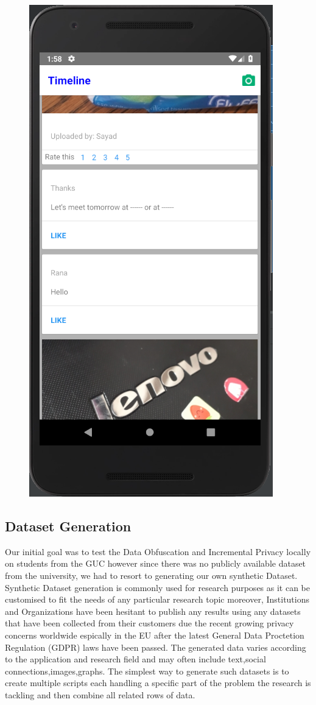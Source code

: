 \begin{figure}[!ht]
\begin{minipage}{.5\textwidth}
      \includegraphics[width=.6\linewidth]{Censor}
      \label{fig:censor}
    \end{minipage}
\end{figure}
\subsection{Dataset Generation}
Our initial goal was to test the Data Obfuscation and Incremental Privacy locally on students from the GUC however since there was no publicly available dataset from the university, we had to resort to generating our own synthetic Dataset.
Synthetic Dataset generation is commonly used for research purposes as it can be customised to fit the needs of any particular research topic moreover, Institutions and Organizations
have been hesitant to publish any results using any datasets that have been collected from their customers due the recent growing privacy concerns worldwide\cite{dandekar2018comparative}  espically in the EU after 
the latest General Data Proctetion Regulation (GDPR) laws have been passed.
The generated data varies according to the application and research field and may often include text,social connections,images,graphs. The simplest way to generate such datasets is to create
multiple scripts each handling a specific part of the problem the research is tackling and then combine all related rows of data.\cite{albuquerque2011synthetic}\par

